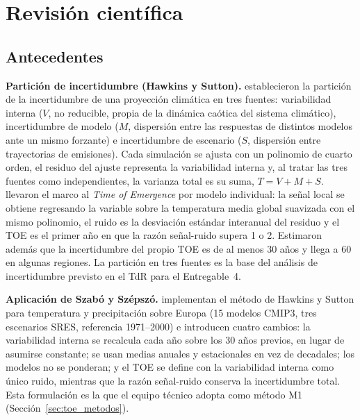 \section{Revisión científica}
\label{sec:marco}

\subsection{Antecedentes}
\label{sec:antecedentes}

\textbf{Partición de incertidumbre (Hawkins y Sutton).} \citet{hawkins2009,hawkins2011precip} establecieron la partición de la incertidumbre de una proyección climática en tres fuentes: variabilidad interna ($V$, no reducible, propia de la dinámica caótica del sistema climático), incertidumbre de modelo ($M$, dispersión entre las respuestas de distintos modelos ante un mismo forzante) e incertidumbre de escenario ($S$, dispersión entre trayectorias de emisiones). Cada simulación se ajusta con un polinomio de cuarto orden, el residuo del ajuste representa la variabilidad interna y, al tratar las tres fuentes como independientes, la varianza total es su suma, $T = V + M + S$. \citet{hawkins2012} llevaron el marco al \emph{Time of Emergence} por modelo individual: la señal local se obtiene regresando la variable sobre la temperatura media global suavizada con el mismo polinomio, el ruido es la desviación estándar interanual del residuo y el TOE es el primer año en que la razón señal-ruido supera 1 o 2. Estimaron además que la incertidumbre del propio TOE es de al menos 30 años y llega a 60 en algunas regiones. La partición en tres fuentes es la base del análisis de incertidumbre previsto en el TdR para el Entregable~4.

\textbf{Aplicación de Szabó y Szépszó.} \citet{szabo2016} implementan el método de Hawkins y Sutton para temperatura y precipitación sobre Europa (15 modelos CMIP3, tres escenarios SRES, referencia 1971--2000) e introducen cuatro cambios: la variabilidad interna se recalcula cada año sobre los 30 años previos, en lugar de asumirse constante; se usan medias anuales y estacionales en vez de decadales; los modelos no se ponderan; y el TOE se define con la variabilidad interna como único ruido, mientras que la razón señal-ruido conserva la incertidumbre total. Esta formulación es la que el equipo técnico adopta como método M1 (Sección~\ref{sec:toe_metodos}).

